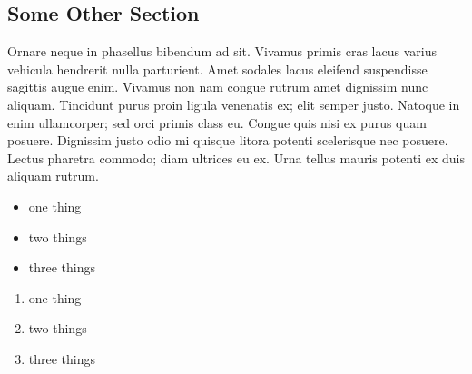 \documentclass[stu,12pt,floatsintext]{apa7}
\begin{document}
\subsection{Some Other Section}


Ornare neque in phasellus bibendum ad sit. Vivamus primis cras lacus varius vehicula hendrerit nulla parturient. Amet sodales lacus eleifend suspendisse sagittis augue enim. Vivamus non nam congue rutrum amet dignissim nunc aliquam. Tincidunt purus proin ligula venenatis ex; elit semper justo. Natoque in enim ullamcorper; sed orci primis class eu. Congue quis nisi ex purus quam posuere. Dignissim justo odio mi quisque litora potenti scelerisque nec posuere. Lectus pharetra commodo; diam ultrices eu ex. Urna tellus mauris potenti ex duis aliquam rutrum.

\begin{itemize}
  \item one thing
  \item two things
  \item three things
\end{itemize}

\begin{enumerate}
  \item one thing
  \item two things
  \item three things
\end{enumerate}
\end{document}
